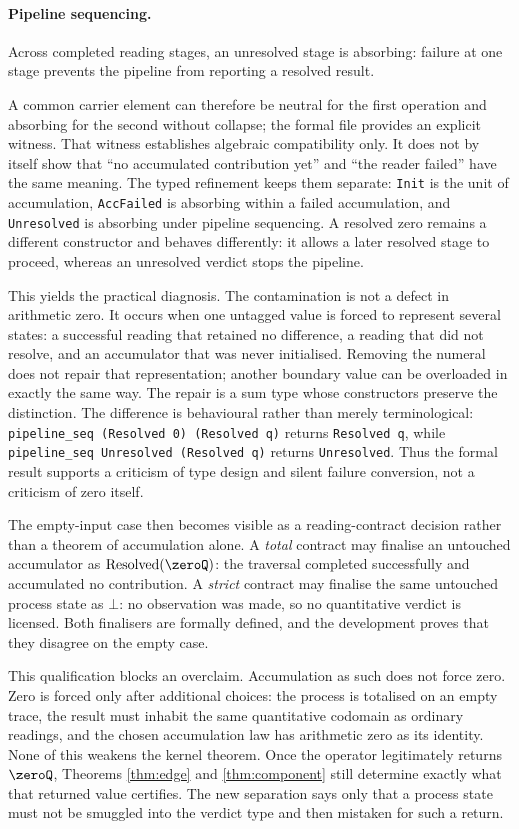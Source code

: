 \paragraph{Pipeline sequencing.} Across completed reading stages, an unresolved stage is absorbing: failure at one stage prevents the pipeline from reporting a resolved result.

A common carrier element can therefore be neutral for the first operation and absorbing for the second without collapse; the formal file provides an explicit witness. That witness establishes algebraic compatibility only. It does not by itself show that ``no accumulated contribution yet'' and ``the reader failed'' have the same meaning. The typed refinement keeps them separate: \verb|Init| is the unit of accumulation, \verb|AccFailed| is absorbing within a failed accumulation, and \verb|Unresolved| is absorbing under pipeline sequencing. A resolved zero remains a different constructor and behaves differently: it allows a later resolved stage to proceed, whereas an unresolved verdict stops the pipeline.

This yields the practical diagnosis. The contamination is not a defect in arithmetic zero. It occurs when one untagged value is forced to represent several states: a successful reading that retained no difference, a reading that did not resolve, and an accumulator that was never initialised. Removing the numeral does not repair that representation; another boundary value can be overloaded in exactly the same way. The repair is a sum type whose constructors preserve the distinction. The difference is behavioural rather than merely terminological: \verb|pipeline_seq (Resolved 0) (Resolved q)| returns \verb|Resolved q|, while \verb|pipeline_seq Unresolved (Resolved q)| returns \verb|Unresolved|. Thus the formal result supports a criticism of type design and silent failure conversion, not a criticism of zero itself.

The empty-input case then becomes visible as a reading-contract decision rather than a theorem of accumulation alone. A \emph{total} contract may finalise an untouched accumulator as \(\mathrm{Resolved}(\zeroQ)\): the traversal completed successfully and accumulated no contribution. A \emph{strict} contract may finalise the same untouched process state as \(\bot\): no observation was made, so no quantitative verdict is licensed. Both finalisers are formally defined, and the development proves that they disagree on the empty case.

This qualification blocks an overclaim. Accumulation as such does not force zero. Zero is forced only after additional choices: the process is totalised on an empty trace, the result must inhabit the same quantitative codomain as ordinary readings, and the chosen accumulation law has arithmetic zero as its identity. None of this weakens the kernel theorem. Once the operator legitimately returns \(\zeroQ\), Theorems \ref{thm:edge} and \ref{thm:component} still determine exactly what that returned value certifies. The new separation says only that a process state must not be smuggled into the verdict type and then mistaken for such a return.
